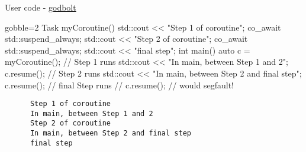 \begin{frame}[fragile]
  \scriptsize
  \begin{block}{User code - \href{https://godbolt.org/z/qx46Pa4v3}{\color{blue!50}godbolt}}
    \begin{cppcode*}{gobble=2}
      Task myCoroutine() {
        std::cout << "Step 1 of coroutine\n";
        co_await std::suspend_always{};
        std::cout << "Step 2 of coroutine\n";
        co_await std::suspend_always{};
        std::cout << "final step\n";
      }
      int main() {
        auto c = myCoroutine(); // Step 1 runs
        std::cout << "In main, between Step 1 and 2\n";
        c.resume();             // Step 2 runs
        std::cout << "In main, between Step 2 and final step\n";
        c.resume();             // final Step runs
        // c.resume(); // would segfault!
      }
    \end{cppcode*}
  \end{block}
  \begin{block}{}
    \begin{verbatim}
      Step 1 of coroutine
      In main, between Step 1 and 2
      Step 2 of coroutine
      In main, between Step 2 and final step
      final step
    \end{verbatim}
  \end{block}
\end{frame}

